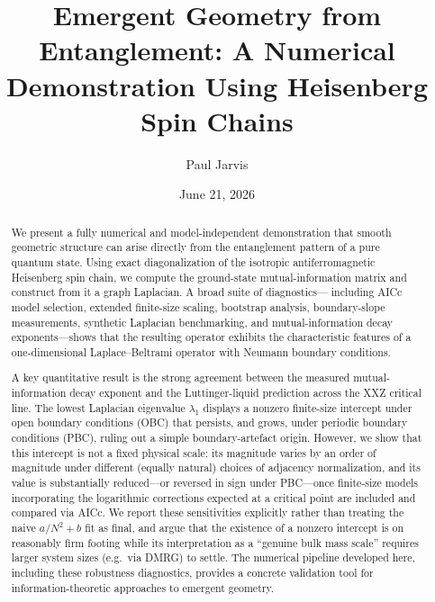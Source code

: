 \documentclass[aps,prd,twocolumn,superscriptaddress,nofootinbib]{revtex4-2}
\begin{document}
\title{Emergent Geometry from Entanglement: A Numerical Demonstration Using Heisenberg Spin Chains}

\author{Paul Jarvis}

\date{June 21, 2026}

\begin{abstract}
We present a fully numerical and model-independent demonstration that smooth
geometric structure can arise directly from the entanglement pattern of a pure
quantum state. Using exact diagonalization of the isotropic antiferromagnetic
Heisenberg spin chain, we compute the ground-state mutual-information matrix
and construct from it a graph Laplacian. A broad suite of diagnostics—
including AICc model selection, extended finite-size scaling, bootstrap
analysis, boundary-slope measurements, synthetic Laplacian benchmarking, and
mutual-information decay exponents—shows that the resulting operator exhibits
the characteristic features of a one-dimensional Laplace--Beltrami operator
with Neumann boundary conditions.

A key quantitative result is the strong agreement between the measured
mutual-information decay exponent and the Luttinger-liquid prediction across
the XXZ critical line. The lowest Laplacian eigenvalue $\lambda_1$ displays a
nonzero finite-size intercept under open boundary conditions (OBC) that
persists, and grows, under periodic boundary conditions (PBC), ruling out a
simple boundary-artefact origin. However, we show that this intercept is not
a fixed physical scale: its magnitude varies by an order of magnitude under
different (equally natural) choices of adjacency normalization, and its value
is substantially reduced---or reversed in sign under PBC---once finite-size
models incorporating the logarithmic corrections expected at a critical point
are included and compared via AICc. We report these sensitivities explicitly
rather than treating the naive $a/N^2+b$ fit as final, and argue that the
existence of a nonzero intercept is on reasonably firm footing while its
interpretation as a ``genuine bulk mass scale'' requires larger system sizes
(e.g.\ via DMRG) to settle. The numerical pipeline developed here, including
these robustness diagnostics, provides a concrete validation tool for
information-theoretic approaches to emergent geometry.
\end{abstract}

\maketitle
\end{document}
